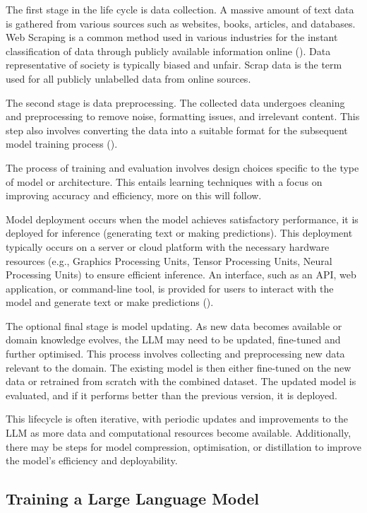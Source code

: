 \documentclass[12pt]{article}
\begin{document}
The first stage in the life cycle is data collection. A massive amount of text data is gathered from various sources such as websites, books, articles, and databases. Web Scraping is a common method used in various industries for the instant classification of data through publicly available information online (\cite{slamet-2018}). Data representative of society is typically biased and unfair. Scrap data is the term used for all publicly unlabelled data from online sources.

The second stage is data preprocessing. The collected data undergoes cleaning and preprocessing to remove noise, formatting issues, and irrelevant content. This step also involves converting the data into a suitable format for the subsequent model training process (\cite{zhang-2023}).

The process of training and evaluation involves design choices specific to the type of model or architecture. This entails learning techniques with a focus on improving accuracy and efficiency, more on this will follow.

Model deployment occurs when the model achieves satisfactory performance, it is deployed for inference (generating text or making predictions). This deployment typically occurs on a server or cloud platform with the necessary hardware resources (e.g., Graphics Processing Units, Tensor Processing Units, Neural Processing Units) to ensure efficient inference. An interface, such as an API, web application, or command-line tool, is provided for users to interact with the model and generate text or make predictions (\cite{park-2024}).

The optional final stage is model updating. As new data becomes available or domain knowledge evolves, the LLM may need to be updated, fine-tuned and further optimised. This process involves collecting and preprocessing new data relevant to the domain. The existing model is then either fine-tuned on the new data or retrained from scratch with the combined dataset. The updated model is evaluated, and if it performs better than the previous version, it is deployed.

This lifecycle is often iterative, with periodic updates and improvements to the LLM as more data and computational resources become available. Additionally, there may be steps for model compression, optimisation, or distillation to improve the model's efficiency and deployability.

\subsection{Training a Large Language Model}
\end{document}
